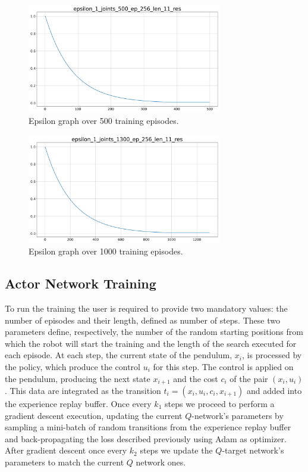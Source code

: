 \documentclass[twocolumn, a4paper]{article}
\begin{document}
\label{fig:TrainLoss1}
\begin{figure}[H]
	\centering
	\includegraphics[width=8.5cm]{"../Figures/epsilon_1J_500E_256EL_11RES.png"} \\
	\caption{Epsilon graph over 500 training episodes.}
	\includegraphics[width=8.5cm]{"../Figures/epsilon_1J_1300E_256EL_11RES.png"}
	\caption{Epsilon graph over 1000 training episodes.}
\end{figure}

\subsection{Actor Network Training}
To run the training the user is required to provide two mandatory values: the
number of episodes and their length, defined as number of steps.
These two parameters define, respectively, the number of the random starting
positions from which the robot will start the training and the length of the
search executed for each episode. At each step, the current state of the
pendulum, \(x_{i}\), is processed by the policy, which produce the control
\(u_{i}\) for this step. The control is applied on the pendulum, producing the
next state \(x_{i+1}\) and the cost \(c_{i}\) of the pair
\((x_{i},u_{i})\). This data are integrated as the transition \(t_{i}=(x_{i},
u_{i}, c_{i}, x_{i+1})\) and added into the experience replay buffer. Once
every \(k_{1}\) steps we proceed to perform a gradient descent execution,
updating the current \(Q\)-network's parameters by sampling a mini-batch of
random transitions from the experience replay buffer and back-propagating the
loss described previously using Adam as optimizer. After gradient descent once
every \(k_{2}\) steps we update the \(Q\)-target network's parameters to match
the current \(Q\) network ones.
\end{document}

